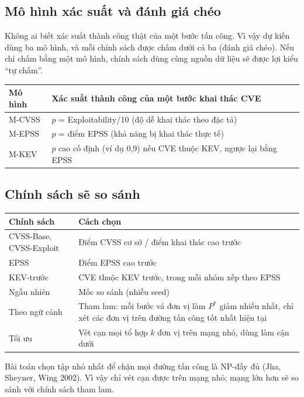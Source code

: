 \documentclass[11pt,a4paper]{article}
\newcommand{\Ps}{P^{*}}
\begin{document}
\subsection{Mô hình xác suất và đánh giá chéo}

Không ai biết xác suất thành công thật của một bước tấn công. Vì vậy dự kiến dùng ba mô hình, và mỗi chính sách được chấm dưới cả ba (đánh giá chéo). Nếu chỉ chấm bằng một mô hình, chính sách dùng cùng nguồn dữ liệu sẽ được lợi kiểu ``tự chấm''.

\begin{center}
\begin{tabular}{@{}Y{2.2cm}Y{12.8cm}@{}}
\toprule
Mô hình & Xác suất thành công của một bước khai thác CVE \\
\midrule
M-CVSS & $p$ = Exploitability/10 (độ dễ khai thác theo đặc tả) \\
M-EPSS & $p$ = điểm EPSS (khả năng bị khai thác thực tế) \\
M-KEV & $p$ cao cố định (ví dụ 0,9) nếu CVE thuộc KEV, ngược lại bằng EPSS \\
\bottomrule
\end{tabular}
\end{center}

\subsection{Chính sách sẽ so sánh}

\begin{center}
\begin{tabular}{@{}Y{3.6cm}Y{11.4cm}@{}}
\toprule
Chính sách & Cách chọn \\
\midrule
CVSS-Base, CVSS-Exploit & Điểm CVSS cơ sở / điểm khai thác cao trước \\
EPSS & Điểm EPSS cao trước \\
KEV-trước & CVE thuộc KEV trước, trong mỗi nhóm xếp theo EPSS \\
Ngẫu nhiên & Mốc so sánh (nhiều seed) \\
Theo ngữ cảnh & Tham lam: mỗi bước vá đơn vị làm $\Ps$ giảm nhiều nhất, chỉ xét các đơn vị trên đường tấn công tốt nhất hiện tại \\
Tối ưu & Vét cạn mọi tổ hợp $k$ đơn vị trên mạng nhỏ, dùng làm cận dưới \\
\bottomrule
\end{tabular}
\end{center}

Bài toán chọn tập nhỏ nhất để chặn mọi đường tấn công là NP-đầy đủ (Jha, Sheyner, Wing 2002). Vì vậy chỉ vét cạn được trên mạng nhỏ; mạng lớn hơn sẽ so sánh với chính sách tham lam.
\end{document}
